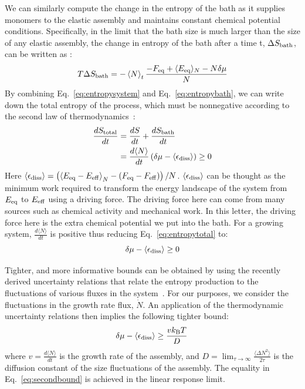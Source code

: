\documentclass[amsmath,preprintnumbers,10pt,nofootinbib,prl,twocolumn]{revtex4-1}
\begin{document}
We can similarly compute the change in the entropy of the bath as it supplies monomers to the elastic assembly and maintains constant chemical potential conditions. Specifically, in the limit that the bath size is much larger than the size of any elastic assembly, the change in entropy of the bath after a time t, $\Delta S_{\rm bath}$, can be written as :
\begin{equation}
\label{eq:entropybath}
 T\Delta S_{\rm bath}=-\left\langle N \right\rangle_t \frac{-F_{\rm{eq}} + \langle E_{\rm{eq}} \rangle _N-N\delta\mu}{N}
\end{equation}
By combining Eq.~\ref{eq:entropysystem} and Eq.~\ref{eq:entropybath}, we can write down the total entropy of the process, which must be nonnegative according to the second law of thermodynamics~\cite{Esposito2012}:
\begin{equation}
\begin{split}
\label{eq:entropytotal}
\frac{dS_{\rm total}}{dt}&=\frac{dS}{dt} +\frac{dS_{\rm bath}}{dt}\\
&= \frac{d\langle N\rangle}{dt}\left ( \delta\mu-\langle\epsilon_{\rm diss}\rangle \right) \geq 0
\end{split}
\end{equation}
Here $\langle\epsilon_{\rm diss}\rangle=\left (\left\langle E_{\rm eq}-E_{\rm{eff}}\right\rangle _N-\left ( F_{\rm eq}-F_{\rm{eff}}\right )\right )/N$. $\langle\epsilon_{\rm diss}\rangle$ can be thought as the minimum work required to transform the energy landscape of the system from $E_{\rm eq}$ to $E_{\rm eff}$ using a driving force. The driving force here can come from many sources such as chemical activity and mechanical work. In this letter, the driving force here is the extra chemical potential we put into the bath.  For a growing system, $\frac{d\langle N \rangle}{dt}$ is positive thus reducing Eq.~\ref{eq:entropytotal} to:
\begin{equation}
\label{eq:firstbound}
\delta\mu-\langle\epsilon_{\rm diss}\rangle\geq0
\end{equation}

Tighter, and more informative bounds can be obtained by using the recently derived uncertainty relations that relate the entropy production to the fluctuations of various fluxes in the system~\cite{Barato2015, Gingrich2016,Nguyen2016}. For our purposes, we consider the fluctuations in the growth rate flux, $\dot{N}$. An application of the thermodynamic uncertainty relations then implies the following tighter bound: 
\begin{equation}
\label{eq:secondbound}
\delta\mu-\langle\epsilon_{\rm diss}\rangle\geq\frac{v k_{\rm B} T}{D}\, 
\end{equation}
where $v=\frac{d\langle N\rangle}{dt}$ is the growth rate of the assembly, and $D=\lim_{\tau\to\infty}\frac{\langle\Delta N^2\rangle}{2\tau}$  is the diffusion constant of the size fluctuations of the assembly. The equality in Eq.~\ref{eq:secondbound} is achieved in the linear response limit. 
\end{document}
